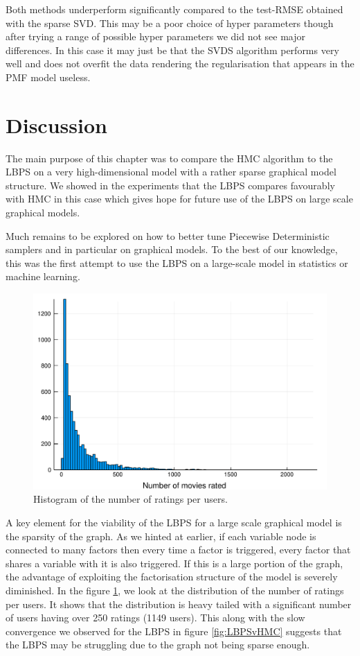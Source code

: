 Both methods underperform significantly compared to the test-RMSE obtained with the sparse SVD.  This may be a poor choice of hyper parameters though after trying a range of possible hyper parameters we did not see major differences. In this case it may just be that the SVDS algorithm performs very well and does not overfit the data rendering the regularisation that appears in the PMF model useless. 

\section{Discussion}

The main purpose of this chapter was to compare the HMC algorithm to the LBPS on a very high-dimensional model with a rather sparse graphical model structure. We showed in the experiments that the LBPS compares favourably with HMC in this case which gives hope for future use of the LBPS on large scale graphical models.

Much remains to be explored on how to better tune Piecewise Deterministic samplers and in particular on graphical models. To the best of our knowledge, this was the first attempt to use the LBPS on a large-scale model in statistics or machine learning. 

\begin{figure}[!h]
\center
	\includegraphics[width=.7\textwidth]{figures/lbp/hist}
	\caption{\label{fig:nratings}Histogram of the number of ratings per users.}
\end{figure}

A key element for the viability of the LBPS for a large scale graphical model is the sparsity of the graph. As we hinted at earlier, if each variable node is connected to many factors then every time a factor is triggered, every factor that shares a variable with it is also triggered. If this is a large portion of the graph, the advantage of exploiting the factorisation structure of the model is severely diminished. 
In the figure \ref{fig:nratings}, we look at the distribution of the number of ratings per users. It shows that the distribution is heavy tailed with a significant number of users having over 250 ratings (1149 users). This along with the slow convergence we observed for the LBPS in figure \ref{fig:LBPSvHMC} suggests that the LBPS may be struggling due to the graph not being sparse enough.

